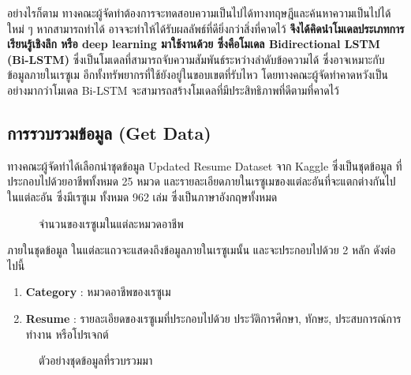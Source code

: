อย่างไรก็ตาม ทางคณะผู้จัดทำต้องการจะทดสอบความเป็นไปได้ทางทฤษฎีและค้นหาความเป็นไปได้ใหม่ ๆ หากสามารถทำได้ อาจจะทำให้ได้รับผลลัพธ์ที่ดียิ่งกว่าสิ่งที่คาดไว้ \textbf{จึงได้คิดนำโมเดลประเภทการเรียนรู้เชิงลึก หรือ deep learning มาใช้งานด้วย
ซึ่งคือโมเดล Bidirectional LSTM (Bi-LSTM)} ซึ่งเป็นโมเดลที่สามารถจับความสัมพันธ์ระหว่างลำดับข้อความได้ ซึ่งอาจเหมาะกับข้อมูลภายในเรซูเม อีกทั้งทรัพยากรที่ใช้ยังอยู่ในขอบเขตที่รับไหว โดยทางคณะผู้จัดทำคาดหวังเป็นอย่างมากว่าโมเดล Bi-LSTM จะสามารถสร้างโมเดลที่มีประสิทธิภาพที่ดีตามที่คาดไว้

\subsection{การรวบรวมข้อมูล (Get Data)}
\label{subsec:Data Collecting}
ทางคณะผู้จัดทำได้เลือกนำชุดข้อมูล Updated Resume Dataset \cite{dataset} จาก Kaggle ซึ่งเป็นชุดข้อมูล
ที่ประกอบไปด้วยอาชีพทั้งหมด 25 หมวด และรายละเอียดภายในเรซูเมของแต่ละอันที่จะแตกต่างกันไปในแต่ละอัน ซึ่งมีเรซูเม
ทั้งหมด 962 เล่ม ซึ่งเป็นภาษาอังกฤษทั้งหมด
\begin{figure}[H]\centering
    \setlength{\fboxrule}{0.2mm} %
    \setlength{\fboxsep}{0.5cm}
    \caption{จำนวนของเรซูเมในแต่ละหมวดอาชีพ}\label{fig:datasetCategory}
\end{figure}
ภายในชุดข้อมูล ในแต่ละแถวจะแสดงถึงข้อมูลภายในเรซูเมนั้น และจะประกอบไปด้วย 2 หลัก ดังต่อไปนี้
\begin{enumerate}
    \item \textbf{Category} : หมวดอาชีพของเรซูเม
    \item \textbf{Resume} : รายละเอียดของเรซูเมที่ประกอบไปด้วย ประวัติการศึกษา, ทักษะ, ประสบการณ์การทำงาน หรือโปรเจกต์
\end{enumerate}
\begin{figure}[H]\centering
    \setlength{\fboxrule}{0.2mm} %
    \setlength{\fboxsep}{0.5cm}
    \caption{ตัวอย่างชุดข้อมูลที่รวบรวมมา}\label{fig:datasetData}
\end{figure}
